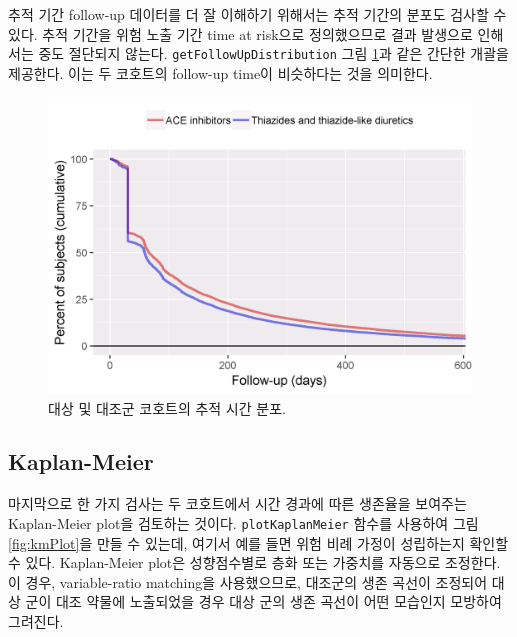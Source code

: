 \documentclass[11pt]{book}
\theoremstyle{definition}
\theoremstyle{definition}
\theoremstyle{definition}
\theoremstyle{remark}
\begin{document}
추적 기간 follow-up 데이터를 더 잘 이해하기 위해서는 추적 기간의 분포도
검사할 수 있다. 추적 기간을 위험 노출 기간 time at risk으로 정의했으므로
결과 발생으로 인해서는 중도 절단되지 않는다.
\texttt{getFollowUpDistribution} 그림 \ref{fig:followUp}과 같은 간단한
개괄을 제공한다. 이는 두 코호트의 follow-up time이 비슷하다는 것을
의미한다.

\begin{figure}

{\centering \includegraphics[width=0.8\linewidth]{images/PopulationLevelEstimation/followUp} 

}

\caption{대상 및 대조군 코호트의 추적 시간 분포.}\label{fig:followUp}
\end{figure}

\subsection{Kaplan-Meier}\label{kaplan-meier}

마지막으로 한 가지 검사는 두 코호트에서 시간 경과에 따른 생존율을
보여주는 Kaplan-Meier plot을 검토하는 것이다. \texttt{plotKaplanMeier}
함수를 사용하여 그림 \ref{fig:kmPlot}을 만들 수 있는데, 여기서 예를 들면
위험 비례 가정이 성립하는지 확인할 수 있다. Kaplan-Meier plot은
성향점수별로 층화 또는 가중치를 자동으로 조정한다. 이 경우,
variable-ratio matching을 사용했으므로, 대조군의 생존 곡선이 조정되어
대상 군이 대조 약물에 노출되었을 경우 대상 군의 생존 곡선이 어떤
모습인지 모방하여 그려진다. 
\end{document}
